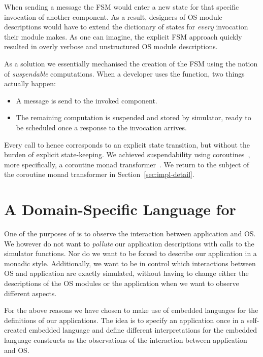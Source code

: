 When sending a message the FSM would enter a new state for that specific invocation of another component.
As a result, designers of OS module descriptions would have to extend the dictionary of states for \emph{every} invocation their module makes.
As one can imagine, the explicit FSM approach quickly resulted in overly verbose and unstructured OS module descriptions.

As a solution we essentially mechanised the creation of the FSM using the notion of \emph{suspendable} computations.
When a developer uses the  function, two things actually happen:
\begin{itemize}
  \item A message is send to the invoked component.
  \item The remaining computation is suspended and stored by simulator, ready to be scheduled once a response to the invocation arrives.
\end{itemize}
Every call to  hence corresponds to an explicit state transition, but without the burden of explicit state-keeping.
We achieved suspendability using coroutines~\cite{coroutines}, more specifically, a coroutine monad transformer~\cite{cmt}.
We return to the subject of the coroutine monad transformer in Section~\ref{sec:impl-detail}.

\section{A Domain-Specific Language for \soosim}
\label{sec:dsl}
One of the purposes of \soosim is to observe the interaction between application and OS.
We however do not want to \emph{pollute} our application descriptions with calls to the simulator functions.
Nor do we want to be forced to describe our application in a monadic style.
Additionally, we want to be in control which interactions between OS and application are exactly simulated, without having to change either the descriptions of the OS modules or the application when we want to observe different aspects.

For the above reasons we have chosen to make use of embedded languages for the definitions of our applications.
The idea is to specify an application once in a self-created embedded language and define different interpretations for the embedded language constructs as the observations of the interaction between application and OS\nolinebreak[3]  \cite{Hofer:2008:PED:1449913.1449935}.

